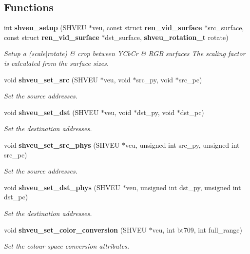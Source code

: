 \subsection*{Functions}
\begin{DoxyCompactItemize}
\item 
int {\bf shveu\_\-setup} (SHVEU $\ast$veu, const struct {\bf ren\_\-vid\_\-surface} $\ast$src\_\-surface, const struct {\bf ren\_\-vid\_\-surface} $\ast$dst\_\-surface, {\bf shveu\_\-rotation\_\-t} rotate)
\begin{DoxyCompactList}\small\item\em Setup a (scale$|$rotate) \& crop between YCbCr \& RGB surfaces The scaling factor is calculated from the surface sizes. \item\end{DoxyCompactList}\item 
void {\bf shveu\_\-set\_\-src} (SHVEU $\ast$veu, void $\ast$src\_\-py, void $\ast$src\_\-pc)
\begin{DoxyCompactList}\small\item\em Set the source addresses. \item\end{DoxyCompactList}\item 
void {\bf shveu\_\-set\_\-dst} (SHVEU $\ast$veu, void $\ast$dst\_\-py, void $\ast$dst\_\-pc)
\begin{DoxyCompactList}\small\item\em Set the destination addresses. \item\end{DoxyCompactList}\item 
void {\bf shveu\_\-set\_\-src\_\-phys} (SHVEU $\ast$veu, unsigned int src\_\-py, unsigned int src\_\-pc)
\begin{DoxyCompactList}\small\item\em Set the source addresses. \item\end{DoxyCompactList}\item 
void {\bf shveu\_\-set\_\-dst\_\-phys} (SHVEU $\ast$veu, unsigned int dst\_\-py, unsigned int dst\_\-pc)
\begin{DoxyCompactList}\small\item\em Set the destination addresses. \item\end{DoxyCompactList}\item 
void {\bf shveu\_\-set\_\-color\_\-conversion} (SHVEU $\ast$veu, int bt709, int full\_\-range)
\begin{DoxyCompactList}\small\item\em Set the colour space conversion attributes. \item\end{DoxyCompactList}\item 

\end{DoxyCompactItemize}
